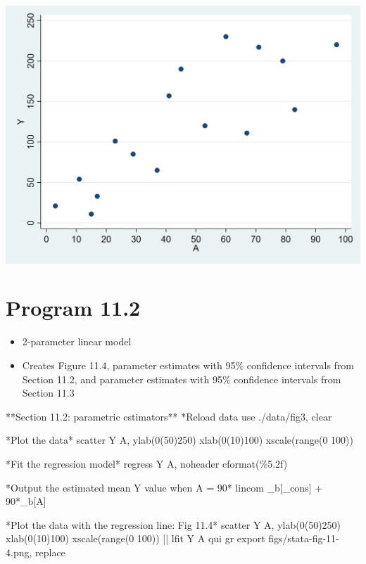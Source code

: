 \documentclass[
  10pt,
  a4paper,
]{book}
\newenvironment{Shaded}{\begin{snugshade}}{\end{snugshade}}
\newcommand{\BaseNTok}[1]{\textcolor[rgb]{0.68,0.00,0.00}{#1}}
\newcommand{\DataTypeTok}[1]{\textcolor[rgb]{0.68,0.00,0.00}{#1}}
\newcommand{\KeywordTok}[1]{\textcolor[rgb]{0.00,0.46,0.62}{#1}}
\newcommand{\NormalTok}[1]{\textcolor[rgb]{0.00,0.46,0.62}{#1}}
\newcommand{\OtherTok}[1]{\textcolor[rgb]{0.00,0.46,0.62}{#1}}
\providecommand{\tightlist}{%
  \setlength{\itemsep}{0pt}\setlength{\parskip}{0pt}}
\begin{document}
\begin{center}\includegraphics[width=0.85\linewidth]{figs/stata-fig-11-3} \end{center}

\hypertarget{program-11.2-1}{%
\section{Program 11.2}\label{program-11.2-1}}

\begin{itemize}
\tightlist
\item
  2-parameter linear model
\item
  Creates Figure 11.4, parameter estimates with 95\% confidence intervals from Section 11.2, and parameter estimates with 95\% confidence intervals from Section 11.3
\end{itemize}

\begin{Shaded}
\begin{Highlighting}[]
\NormalTok{**Section 11.2: parametric estimators**}
\NormalTok{*Reload }\KeywordTok{data}
\KeywordTok{use}\NormalTok{ ./}\KeywordTok{data}\NormalTok{/fig3, }\KeywordTok{clear}

\NormalTok{*Plot the }\KeywordTok{data}\NormalTok{*}
\KeywordTok{scatter}\NormalTok{ Y A, ylab(0(50)250) xlab(0(10)100) }\BaseNTok{xscale}\NormalTok{(}\KeywordTok{range}\NormalTok{(0 100))}

\NormalTok{*Fit the regression }\KeywordTok{model}\NormalTok{*}
\KeywordTok{regress}\NormalTok{ Y A, }\KeywordTok{noheader}\NormalTok{ cformat(\%5.2f)}

\NormalTok{*Output the estimated }\KeywordTok{mean}\NormalTok{ Y }\OtherTok{value}\NormalTok{ when A = 90*}
\KeywordTok{lincom}\NormalTok{ \_b[}\DataTypeTok{\_cons}\NormalTok{] + 90*\_b[A]}

\NormalTok{*Plot the }\KeywordTok{data}\NormalTok{ with the regression }\KeywordTok{line}\NormalTok{: Fig 11.4*}
\KeywordTok{scatter}\NormalTok{ Y A, ylab(0(50)250) xlab(0(10)100) }\BaseNTok{xscale}\NormalTok{(}\KeywordTok{range}\NormalTok{(0 100)) || }\KeywordTok{lfit}\NormalTok{ Y A}
\KeywordTok{qui} \KeywordTok{gr} \KeywordTok{export}\NormalTok{ figs/stata{-}fig{-}11{-}4.png, }\KeywordTok{replace}
\end{Highlighting}
\end{Shaded}
\end{document}
